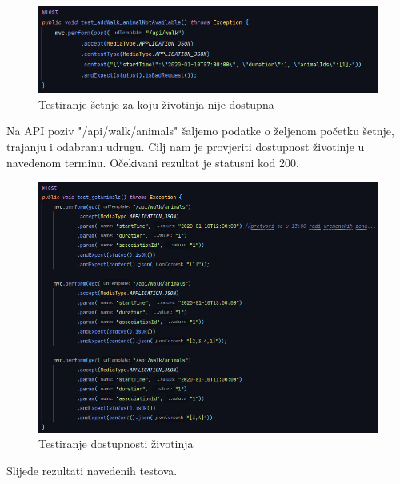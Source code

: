 	\begin{figure}[H]
		\includegraphics[width=\linewidth]{slike/Testovi-10.png}
		\centering
		\caption{Testiranje šetnje za koju životinja nije dostupna}
		\label{fig:testovi10}
	\end{figure}

	\eject

	\noindent Na API poziv "/api/walk/animals" šaljemo podatke o željenom početku šetnje, trajanju i odabranu udrugu. Cilj nam je provjeriti dostupnost životinje u navedenom terminu. Očekivani rezultat je statusni kod 200.

	\begin{figure}[H]
		\includegraphics[width=\linewidth]{slike/Testovi-11.png}
		\centering
		\caption{Testiranje dostupnosti životinja}
		\label{fig:testovi11}
	\end{figure}

	\eject

	\noindent Slijede rezultati navedenih testova.

